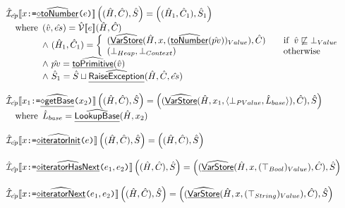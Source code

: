 \[
\begin{array}{ll}
\hat{\mathcal{I}}_{\hat{cp}}\llbracket x \mbox{\texttt{:=}} \widehat{\underline{\sf \diamond toNumber}}\mbox{\texttt{(}}e\mbox{\texttt{)}} \rrbracket \left((\hat{H},\hat{C}),\hat{S}\right)
= \left((\hat{H}_1,\hat{C}_1),\hat{S}_1\right)
\\\quad{\rm where}\begin{array}[t]{l}
  (\hat{v},\hat{es}) = \hat{\mathcal{V}}\llbracket e\rrbracket(\hat{H},\hat{C})\\
  \land\ (\hat{H}_1, \hat{C}_1) = \left\{
     \begin{array}{ll}
       (\widehat{\underline{\sf VarStore}}(\hat{H},x,(\widehat{\underline{\sf toNumber}}(\hat{pv}))_{Value}), \hat{C})
       & \quad{\rm if}\begin{array}[t]{l}\hat{v}\not\sqsubseteq\bot_{Value}\end{array} \\
       (\bot_{Heap}, \bot_{Context}) & \quad{\rm otherwise}
     \end{array}\right.\\
  \land\ \hat{pv}=\widehat{\underline{\sf toPrimitive}}(\hat{v})\\
  \land\ \hat{S}_1 = \hat{S}\sqcup\widehat{\underline{\sf RaiseException}}(\hat{H},\hat{C}, \hat{es})
\end{array}\\\\

\hat{\mathcal{I}}_{\hat{cp}}\llbracket x_1 \mbox{\texttt{:=}} \widehat{\underline{\sf \diamond getBase}}\mbox{\texttt{(}}x_2\mbox{\texttt{)}} \rrbracket \left((\hat{H},\hat{C}),\hat{S}\right)
 = \left((\widehat{\underline{\sf VarStore}}(\hat{H},x_1,\langle\bot_{PValue},\hat{L}_{base}\rangle),\hat{C}),\hat{S}\right) \\
\quad{\rm where}\begin{array}[t]{l}
  \hat{L}_{base}=\widehat{\underline{\sf LookupBase}}(\hat{H},x_2)
\end{array}
\\\\

\hat{\mathcal{I}} _{\hat{cp}}\llbracket x \mbox{\texttt{:=}} \widehat{\underline{\sf \diamond iteratorInit}}\mbox{\texttt{(}}e\mbox{\texttt{)}} \rrbracket \left((\hat{H},\hat{C}),\hat{S}\right)
 = \left((\hat{H}, \hat{C}),\hat{S}\right)
\\\\

\hat{\mathcal{I}} _{\hat{cp}}\llbracket x \mbox{\texttt{:=}} \widehat{\underline{\sf \diamond iteratorHasNext}}\mbox{\texttt{(}}e_1,e_2\mbox{\texttt{)}} \rrbracket \left((\hat{H},\hat{C}),\hat{S}\right)
 = \left((\widehat{\underline{\sf VarStore}}(\hat{H},x,(\top_{Bool})_{Value}),\hat{C}),\hat{S}\right) 
\\\\

\hat{\mathcal{I}} _{\hat{cp}}\llbracket x \mbox{\texttt{:=}} \widehat{\underline{\sf \diamond iteratorNext}}\mbox{\texttt{(}}e_1,e_2\mbox{\texttt{)}} \rrbracket \left((\hat{H},\hat{C}),\hat{S}\right)
 = \left((\widehat{\underline{\sf VarStore}}(\hat{H},x,(\top_{String})_{Value}),\hat{C}),\hat{S}\right)
\\\\


\end{array}\]

